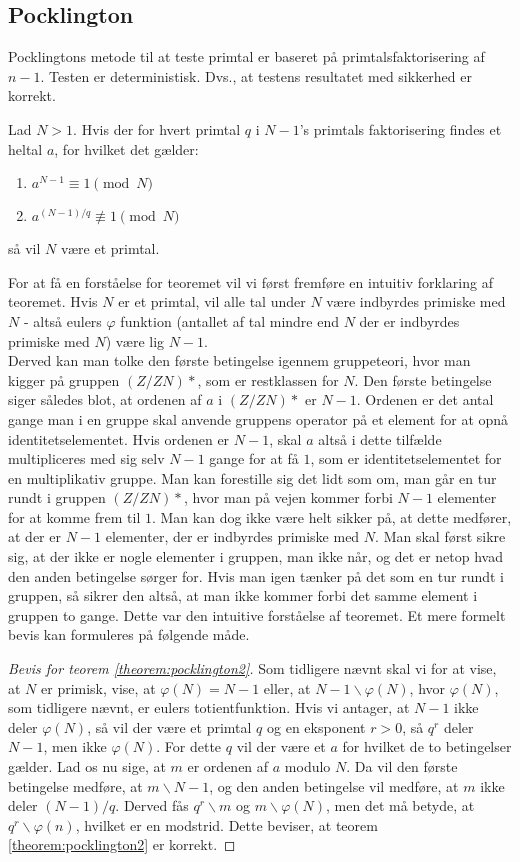 \subsection{Pocklington}
Pocklingtons metode til at teste primtal er baseret på primtalsfaktorisering af $n-1$. 
Testen er deterministisk. Dvs., at testens resultatet med sikkerhed er korrekt.
\begin{theorem}
\label{theorem:pocklington2}
Lad $N > 1$. Hvis der for hvert primtal $q$ i $N-1$'s primtals faktorisering findes et heltal $a$, for hvilket det gælder: 
\begin{enumerate}
\item $a^{N-1}\equiv 1 \pmod{N}$
\item $a^{(N-1)/q} \not \equiv 1 \pmod{N}$
\end{enumerate}
så vil $N$ være et primtal.
\end{theorem}
For at få en forståelse for teoremet vil vi først fremføre en intuitiv forklaring af teoremet. Hvis
$N$ er et primtal, vil alle tal under $N$ være indbyrdes primiske med $N$ - altså eulers $\varphi$ funktion (antallet af tal mindre end $N$ der er indbyrdes primiske med $N$) være lig $N-1$.\\
Derved kan man tolke den første betingelse igennem gruppeteori, hvor man kigger på gruppen $(Z/ZN)*$, som er restklassen
for $N$. 
Den første betingelse siger således blot, at ordenen af $a$ i $(Z/ZN)*$ er $N-1$. Ordenen er det antal gange
man i en gruppe skal anvende gruppens operator på et element for at opnå identitetselementet. Hvis ordenen er $N-1$, skal $a$ altså i
dette tilfælde multipliceres med sig selv $N-1$ gange for at få $1$, som er identitetselementet for en multiplikativ gruppe.
Man kan forestille sig det lidt som om, man går en tur rundt i gruppen $(Z/ZN)*$, hvor man på vejen kommer forbi $N-1$ elementer
for at komme frem til $1$.
Man kan dog ikke være helt sikker på, at dette medfører, at der er $N-1$ elementer, der er indbyrdes primiske med $N$. Man skal først 
sikre sig, at der ikke er nogle elementer i gruppen, man ikke når, og det er netop hvad den anden betingelse sørger for. 
Hvis man igen tænker på det som en tur rundt i gruppen, så sikrer den altså, at man ikke kommer forbi det samme element i gruppen
to gange. Dette var den intuitive forståelse af teoremet. Et mere formelt bevis kan formuleres på følgende måde.
\begin{proof}[Bevis for teorem \ref{theorem:pocklington2}]
Som tidligere nævnt skal vi for at vise, at $N$ er primisk, vise, at $\varphi(N)=N-1$ eller, at $N-1 \backslash \varphi(N)$,
hvor $\varphi(N)$, som tidligere nævnt, er eulers totientfunktion. Hvis vi antager, at $N-1$ ikke deler $\varphi(N)$, så 
vil der være et primtal $q$ og en eksponent $r>0$, så $q^r$ deler $N-1$, men ikke $\varphi(N)$. For dette $q$ vil der være et $a$ for hvilket
de to betingelser gælder. Lad os nu sige, at $m$ er ordenen af $a$ modulo $N$. Da vil den første betingelse medføre, at $m \backslash N-1$, og den
anden betingelse vil medføre, at $m$ ikke deler $(N-1)/q$. Derved fås $q^r \backslash m$ og $m \backslash \varphi(N)$, men det må betyde, at $q^r \backslash \varphi(n)$, hvilket er en modstrid. Dette beviser, at teorem \ref{theorem:pocklington2} er korrekt.
\end{proof}
